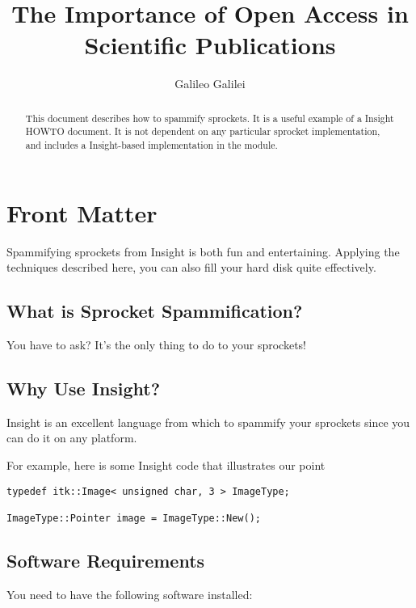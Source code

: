 \documentclass{InsightArticle}
\title{The Importance of Open Access in Scientific Publications}
\author{Galileo Galilei}
\begin{document}
\maketitle


\ifhtml
\chapter*{Front Matter\label{front}}
\fi


\begin{abstract}
\noindent
This document describes how to spammify sprockets.  It is a useful
example of a Insight HOWTO document.  It is not dependent on any
particular sprocket implementation, and includes a Insight-based
implementation in the  module.
\end{abstract}

\tableofcontents

Spammifying sprockets from Insight is both fun and entertaining.
Applying the techniques described here, you can also fill your hard
disk quite effectively.

\section{What is Sprocket Spammification?}

You have to ask?  It's the only thing to do to your sprockets!


\section{Why Use Insight?}

Insight is an excellent language from which to spammify your sprockets
since you can do it on any platform.

For example, here is some Insight code that illustrates our point

\small
\begin{verbatim}
typedef itk::Image< unsigned char, 3 > ImageType;

ImageType::Pointer image = ImageType::New();
\end{verbatim}
\normalsize


\section{Software Requirements}

You need to have the following software installed:
\end{document}

